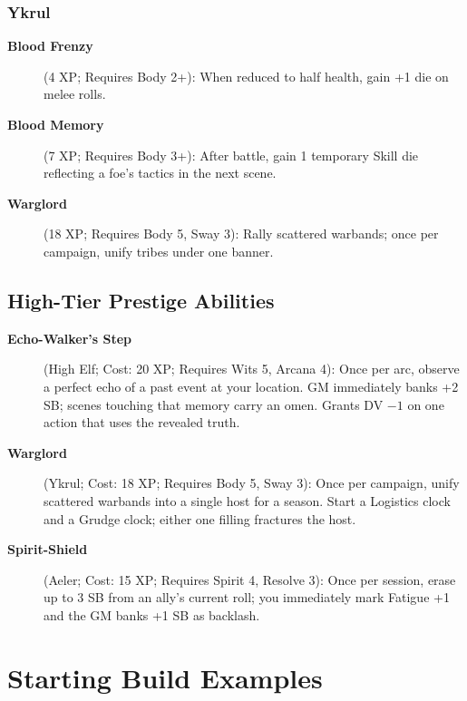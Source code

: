 \subsubsection{Ykrul}
\label{subsubsec:ykrul-talents}

\begin{description}
\item[\textbf{Blood Frenzy}] (4 XP; Requires Body 2+): When reduced to half health, gain +1 die on melee rolls.
\item[\textbf{Blood Memory}] (7 XP; Requires Body 3+): After battle, gain 1 temporary Skill die reflecting a foe's tactics in the next scene.
\item[\textbf{Warglord}] (18 XP; Requires Body 5, Sway 3): Rally scattered warbands; once per campaign, unify tribes under one banner.
\end{description}

\subsection{High-Tier Prestige Abilities}
\label{subsec:high-tier-prestige}

\begin{description}
\item[\textbf{Echo-Walker's Step}] (High Elf; Cost: 20 XP; Requires Wits 5, Arcana 4): Once per arc, observe a perfect echo of a past event at your location. GM immediately banks +2 SB; scenes touching that memory carry an omen. Grants DV $-1$ on one action that uses the revealed truth.
\item[\textbf{Warglord}] (Ykrul; Cost: 18 XP; Requires Body 5, Sway 3): Once per campaign, unify scattered warbands into a single host for a season. Start a Logistics clock and a Grudge clock; either one filling fractures the host.
\item[\textbf{Spirit-Shield}] (Aeler; Cost: 15 XP; Requires Spirit 4, Resolve 3): Once per session, erase up to 3 SB from an ally's current roll; you immediately mark Fatigue +1 and the GM banks +1 SB as backlash.
\end{description}

\section{Starting Build Examples}
\label{sec:starting-examples}

